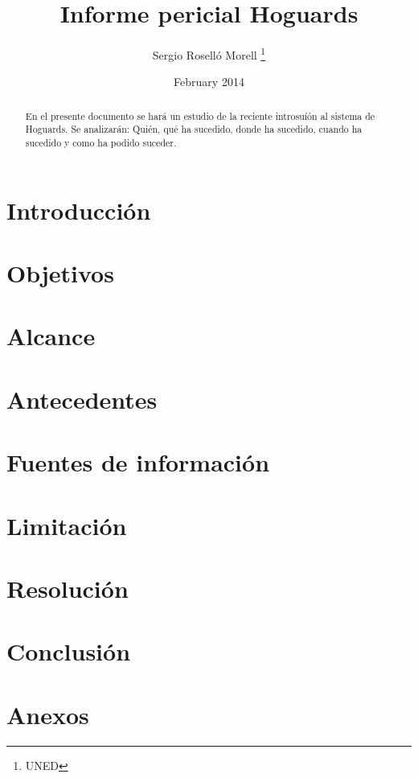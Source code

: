 \documentclass[a4paper,11pt]{article}
\title{Informe pericial Hoguards}
\author{Sergio Roselló Morell \thanks{UNED}}
\date{February 2014}
\begin{document}
\begin{titlepage}
\maketitle
\end{titlepage}

\begin{abstract}
En el presente documento se hará un estudio de la reciente introsuíón al sistema de Hoguards. Se analizarán: Quién, qué ha sucedido, donde ha sucedido, cuando ha sucedido y como ha podido suceder.
\end{abstract}

\clearpage

\tableofcontents

\clearpage

\section{Introducción}

\section{Objetivos}

\section{Alcance}

\section{Antecedentes}

\section{Fuentes de información}

\section{Limitación}

\section{Resolución}

\section{Conclusión}

\section{Anexos}


\printbibliography
\end{document}
